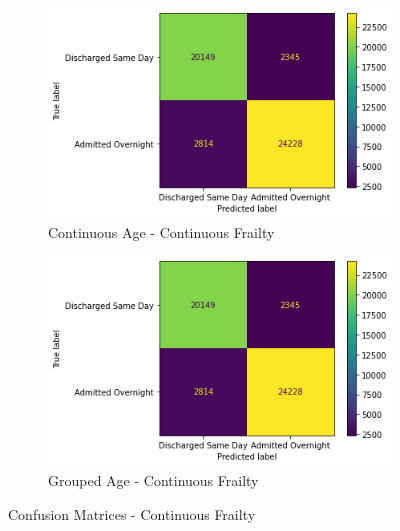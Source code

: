 \documentclass[../thesis.tex]{subfiles}
\begin{document}
\begin{figure}[h!]
\centering
\begin{subfigure}{.5\textwidth}
  \centering
  \includegraphics[width=1\linewidth]{Chapter4/Figures/FIG5AA.png}
  \caption{Continuous Age - Continuous Frailty}
  \label{Fig:Confusion2a}
\end{subfigure}%
\begin{subfigure}{.5\textwidth}
  \centering
  \includegraphics[width=1\linewidth]{Chapter4/Figures/FIG5BA.png}
  \caption{Grouped Age - Continuous Frailty}
  \label{Fig:Confusion2b}
\end{subfigure}
\caption{Confusion Matrices - Continuous Frailty}
\label{Fig:Confusion2}
\end{figure}
\end{document}
